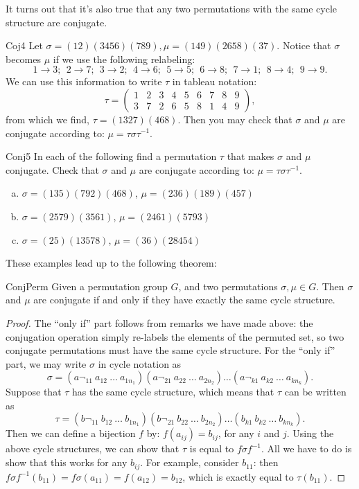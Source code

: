 It turns out that it's also true that any two permutations with the same cycle structure are conjugate.

\begin{example}{Coj4}
Let $\sigma = (12)(3456)(789), \mu = (149)(2658)(37)$.  Notice that $\sigma$ becomes $\mu$ if we use the following relabeling:
$$ 1 \rightarrow 3;~~2 \rightarrow 7;~~3\rightarrow 2;~~4\rightarrow 6;~~5\rightarrow 5;~~6\rightarrow 8;~~7\rightarrow 1;~~8\rightarrow 4;~~9\rightarrow 9.$$
We can use this information to write $\tau$ in tableau notation:
$$ \tau =\begin{pmatrix} 1&2&3&4&5&6&7&8&9 \\ 3&7&2&6&5&8&1&4&9 \end{pmatrix}, $$
from which we find, $\tau=(1327)(468)$.  Then you may check that $\sigma$ and $\mu$ are conjugate according to: $\mu = \tau \sigma \tau^{-1}$.
\end{example}
\begin{exercise}{Conj5}
In each of the following find a permutation $\tau$ that makes $\sigma$ and $\mu$ conjugate.  Check that $\sigma$ and $\mu$ are conjugate according to: $\mu = \tau \sigma \tau^{-1}$.

\begin {enumerate}[(a)]
\item $\sigma=(135)(792)(468)$, $\mu=(236)(189)(457)$
\item $\sigma=(2579)(3561)$, $\mu=(2461)(5793)$
\item $\sigma=(25)(13578)$, $\mu=(36)(28454)$
\end{enumerate}
\end{exercise}
These examples lead up to the following theorem:

\begin{prop}{ConjPerm} Given a permutation group $G$, and two permutations $\sigma, \mu \in G$.  Then $\sigma$ and $\mu$ are conjugate if and only if they have exactly the same cycle structure.
\end{prop}
\begin{proof}
The ``only if'' part follows from remarks we have made above: the conjugation operation simply re-labels the elements of the permuted set, so two conjugate permutations must have the same cycle structure.
For the ``only if'' part, we may write $\sigma$ in cycle notation as
$$\sigma = (a¬_{11}~a_{12}~\ldots~a_{1n_1})(a¬_{21}~a_{22}~\ldots~a_{2n_2})  \ldots(a¬_{k1}~a_{k2}~\ldots~a_{k n_k}).$$  
Suppose that $\tau$ has the same cycle structure, which means that $\tau$ can be written as
$$\tau = (b¬_{11}~b_{12}~\ldots~b_{1n_1})(b¬_{21}~b_{22}~\ldots~b_{2n_2})  \ldots(b_{k1}~b_{k2}~\ldots~b_{k n_k}).$$
Then we can define a bijection $f$ by: $f(a_{ij}) = b_{ij}$, for any $i$ and $j$. Using the above cycle structures, we can show that $\tau$ is equal to $f \sigma f^{-1}$.  All we have to do is show that this works for any $ b_{ij}$.  For example, consider $b_{11}$: then $f \sigma f^{-1}( b_{11}) = f \sigma ( a_{11}) = f ( a_{12})= b_{12}$, which is exactly equal to $ \tau(b_{11})$.
\end{proof}

